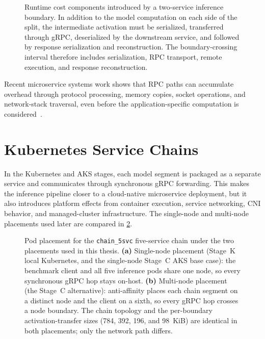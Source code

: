 \begin{figure}[htbp]
\centering
%
\caption[Runtime cost components of an inference boundary]{Runtime cost components introduced by a two-service inference
boundary. In addition to the model computation on each side of the split,
the intermediate activation must be serialized, transferred through gRPC,
deserialized by the downstream service, and followed by response
serialization and reconstruction. The boundary-crossing interval therefore
includes serialization, RPC transport, remote execution, and response
reconstruction.}
\label{fig:service_boundary_rpc_cost}
\end{figure}

Recent microservice systems work shows that RPC paths can accumulate overhead through
protocol processing, memory copies, socket operations, and network-stack traversal,
even before the application-specific computation is considered~\cite{rpc_overhead_hotos25,notnets_apsys24}.

\section{Kubernetes Service Chains}
\label{sec:bg-kubernetes-chains}

In the Kubernetes and AKS stages, each model segment is packaged as a separate service
and communicates through synchronous gRPC forwarding. This makes the inference pipeline
closer to a cloud-native microservice deployment, but it also introduces platform
effects from container execution, service networking, CNI behavior, and managed-cluster
infrastructure. The single-node and multi-node placements used later are compared in
\cref{fig:chain5_placement_comparison}.

\begin{figure}[htbp]
\centering
%
\caption[Single-node vs.\ multi-node pod placement]{Pod placement for the \texttt{chain\_5svc} five-service chain under the
two placements used in this thesis. \textbf{(a)} Single-node placement (Stage~K
local Kubernetes, and the single-node Stage~C AKS base case): the benchmark
client and all five inference pods share one node, so every synchronous gRPC hop
stays on-host. \textbf{(b)} Multi-node placement (the Stage~C alternative):
anti-affinity places each chain segment on a distinct node and the client on a
sixth, so every gRPC hop crosses a node boundary. The chain topology and the
per-boundary activation-transfer sizes (784, 392, 196, and 98~KiB) are identical
in both placements; only the network path differs.}
\label{fig:chain5_placement_comparison}
\end{figure}

